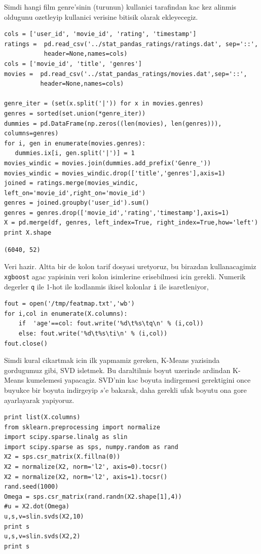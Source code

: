 \documentclass[12pt,fleqn]{article}\usepackage{../common}
\begin{document}
Simdi hangi film genre'sinin (turunun) kullanici tarafindan kac kez alinmis
oldugunu ozetleyip kullanici verisine bitisik olarak ekleyecegiz. 

\begin{verbatim}
cols = ['user_id', 'movie_id', 'rating', 'timestamp']
ratings =  pd.read_csv('../stat_pandas_ratings/ratings.dat', sep='::',
           header=None,names=cols)
cols = ['movie_id', 'title', 'genres']
movies =  pd.read_csv('../stat_pandas_ratings/movies.dat',sep='::',
          header=None,names=cols)

genre_iter = (set(x.split('|')) for x in movies.genres)
genres = sorted(set.union(*genre_iter))
dummies = pd.DataFrame(np.zeros((len(movies), len(genres))), columns=genres)
for i, gen in enumerate(movies.genres):
   dummies.ix[i, gen.split('|')] = 1
movies_windic = movies.join(dummies.add_prefix('Genre_'))
movies_windic = movies_windic.drop(['title','genres'],axis=1)
joined = ratings.merge(movies_windic, left_on='movie_id',right_on='movie_id')
genres = joined.groupby('user_id').sum()
genres = genres.drop(['movie_id','rating','timestamp'],axis=1)
X = pd.merge(df, genres, left_index=True, right_index=True,how='left')
print X.shape
\end{verbatim}

\begin{verbatim}
(6040, 52)
\end{verbatim}

Veri hazir. Altta bir de kolon tarif dosyasi uretyoruz, bu birazdan
kullanacagimiz \verb!xgboost! agac yapisinin veri kolon isimlerine
erisebilmesi icin gerekli. Numerik degerler \verb!q!  ile 1-hot ile
kodlanmis ikisel kolonlar \verb!i! ile isaretleniyor,

\begin{verbatim}
fout = open('/tmp/featmap.txt','wb')
for i,col in enumerate(X.columns):
    if  'age'==col: fout.write('%d\t%s\tq\n' % (i,col))
    else: fout.write('%d\t%s\ti\n' % (i,col))    
fout.close()
\end{verbatim}

Simdi kural cikartmak icin ilk yapmamiz gereken, K-Means yazisinda
gordugumuz gibi, SVD isletmek. Bu daraltilmis boyut uzerinde ardindan
K-Means kumelemesi yapacagiz. SVD'nin kac boyuta indirgemesi gerektigini
once buyukce bir boyuta indirgeyip $s$'e bakarak, daha gerekli ufak boyutu
ona gore ayarlayarak yapiyoruz.

\begin{verbatim}
print list(X.columns)
from sklearn.preprocessing import normalize
import scipy.sparse.linalg as slin
import scipy.sparse as sps, numpy.random as rand
X2 = sps.csr_matrix(X.fillna(0))
X2 = normalize(X2, norm='l2', axis=0).tocsr()
X2 = normalize(X2, norm='l2', axis=1).tocsr()    
rand.seed(1000)
Omega = sps.csr_matrix(rand.randn(X2.shape[1],4))
#u = X2.dot(Omega)
u,s,v=slin.svds(X2,10)
print s
u,s,v=slin.svds(X2,2)
print s
\end{verbatim}
\end{document}
